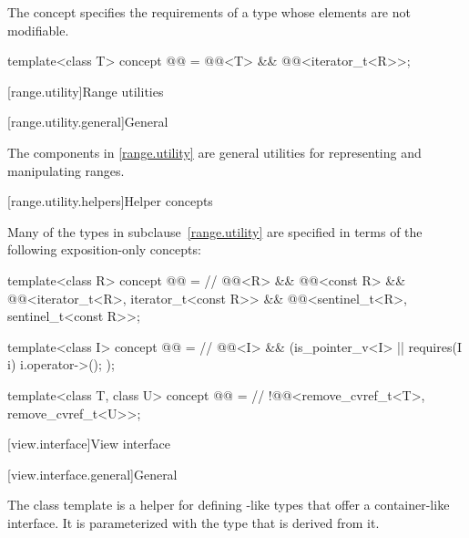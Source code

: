 \pnum
The  concept specifies the requirements of a
 type whose elements are not modifiable.

\begin{itemdecl}
template<class T>
  concept @@ =
    @@<T> && @@<iterator_t<R>>;
\end{itemdecl}

[range.utility]{Range utilities}

[range.utility.general]{General}

\pnum
The components in \ref{range.utility} are general utilities for representing and
manipulating ranges.

[range.utility.helpers]{Helper concepts}

\pnum
Many of the types in subclause~\ref{range.utility} are specified in terms of
the following exposition-only concepts:

\begin{codeblock}
template<class R>
  concept @@ =                                     // \expos
    @@<R> && @@<const R> &&
    @@<iterator_t<R>, iterator_t<const R>> &&
    @@<sentinel_t<R>, sentinel_t<const R>>;

template<class I>
  concept @@ =                                       // \expos
    @@<I> && (is_pointer_v<I> || requires(I i) { i.operator->(); });

template<class T, class U>
  concept @@ =                                  // \expos
    !@@<remove_cvref_t<T>, remove_cvref_t<U>>;
\end{codeblock}

[view.interface]{View interface}

[view.interface.general]{General}

\pnum
The class template  is a helper for defining
-like types that offer a container-like interface. It is
parameterized with the type that is derived from it.

